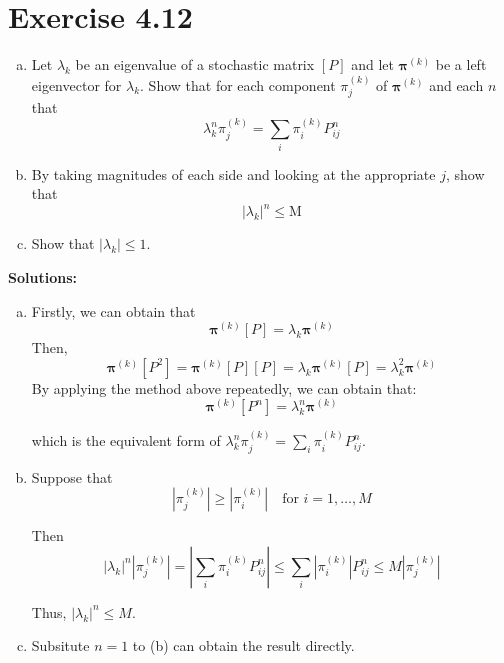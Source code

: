 \documentclass{article}
\begin{document}
    \section{Exercise 4.12}
    \begin{enumerate}[(a)]
        \item Let $\lambda_k$ be an eigenvalue of a stochastic matrix $[P]$ and let $\bm{\pi}^{(k)}$ be a left eigenvector for $\lambda_k$. Show that for each component $\pi_j^{(k)}$ of $\bm{\pi}^{(k)}$ and each $n$ that
        \begin{equation*}
            \lambda^n_k\pi_j^{(k)}=\sum_i\pi_i^{(k)}P^n_{ij}
        \end{equation*} 
        \item By taking magnitudes of each side and looking at the appropriate $j$, show that
        \begin{equation*}
            |\lambda_k|^n\leq\text{M}
        \end{equation*}
        \item Show that $|\lambda_k|\leq 1$.
    \end{enumerate}
    \textbf{Solutions:}
    \begin{enumerate}[(a)]
        \item Firstly, we can obtain that
            \begin{equation*}
                \bm{\pi}^{(k)}[P]=\lambda_k\bm{\pi}^{(k)}
            \end{equation*}
            Then,
            \begin{equation*}
                \bm{\pi}^{(k)}[P^2]=\bm{\pi}^{(k)}[P][P]=\lambda_k\bm{\pi}^{(k)}[P]=\lambda_k^2\bm{\pi}^{(k)}
            \end{equation*}
            By applying the method above repeatedly, we can obtain that:
            \begin{equation*}
                \bm{\pi}^{(k)}[P^n]=\lambda^n_k\bm{\pi}^{(k)}
            \end{equation*}

            which is the equivalent form of $\lambda^n_k\pi_j^{(k)}=\sum_i\pi_i^{(k)}P^n_{ij}$.
        \item Suppose that
            \begin{equation*}
                |\pi_j^{(k)}|\geq|\pi_i^{(k)}|\quad\text{for }i=1,\dots,M 
            \end{equation*}

            Then
            \begin{equation*}
                |\lambda_k|^n|\pi_j^{(k)}|=|\sum_i\pi_i^{(k)}P_{ij}^n|\leq\sum_i|\pi^{(k)}_i|P_{ij}^n\leq M|\pi_j^{(k)}|
            \end{equation*}

            Thus, $|\lambda_k|^n\leq M$.

        \item Subsitute $n=1$ to (b) can obtain the result directly.
    \end{enumerate}
\end{document}
